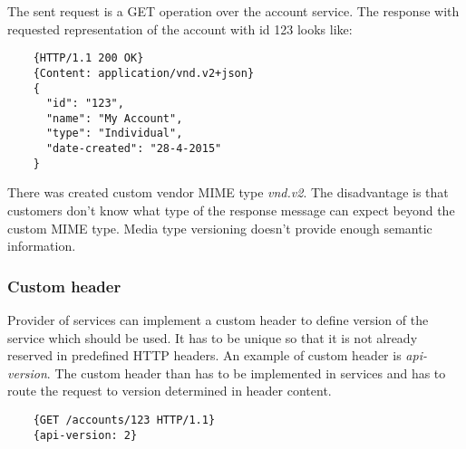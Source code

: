 The sent request is a GET operation over the account service. The response with requested representation of the account with id 123 looks like:

\begin{lstlisting}
    {HTTP/1.1 200 OK}
    {Content: application/vnd.v2+json}
    {
      "id": "123",
      "name": "My Account",
      "type": "Individual",
      "date-created": "28-4-2015"
    }       
\end{lstlisting}

There was created custom vendor MIME type \emph{vnd.v2}. The disadvantage is that customers don't know what type of the response message can expect beyond the custom MIME type. Media type versioning doesn't provide enough semantic information.





\subsubsection{Custom header}
Provider of services can implement a custom header to define version of the service which should be used. It has to be unique so that it is not already reserved in predefined HTTP headers. An example of custom header is \emph{api-version}. The custom header than has to be implemented in services and has to route the request to version determined in header content.

\begin{lstlisting}
    {GET /accounts/123 HTTP/1.1}
    {api-version: 2}
\end{lstlisting}

